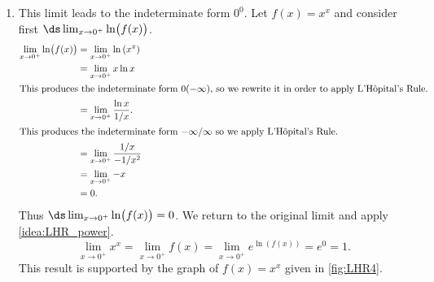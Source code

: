 \begin{example}
\begin{enumerate}
\item		This limit leads to the indeterminate form $0^0$. Let $f(x) = x^x$ and consider first $\ds\lim_{x\to0^+} \ln\bigl(f(x)\bigr)$. 
%
%
%
\begin{align*}
\lim_{x\to0^+} \ln\bigl(f(x)\bigr) &= \lim_{x\to0^+} \ln\left(x^x\right) \\
			&= \lim_{x\to0^+} x\ln x \\
			\intertext{This produces the indeterminate form $0(-\infty)$, so we rewrite it in order to apply L'Hôpital's Rule.}
			&= \lim_{x\to0^+} \frac{\ln x}{1/x}.\\
			\intertext{This produces the indeterminate form $-\infty/\infty$ so we apply L'Hôpital's Rule.}
			&=	\lim_{x\to0^+} \frac{1/x}{-1/x^2} \\
			&= \lim_{x\to0^+} -x \\
			&= 0.
\end{align*}%
Thus $\ds\lim_{x\to0^+} \ln\bigl(f(x)\bigr) =0$. We return to the original limit and apply \autoref{idea:LHR_power}.
\[
\lim_{x\to0^+} x^x = \lim_{x\to0^+} f(x) = \lim_{x\to0^+} e^{\ln(f(x))} = e^0 = 1.
\]
This result is supported by the graph of $f(x)=x^x$ given in \autoref{fig:LHR4}.
\end{enumerate}
\end{example}



